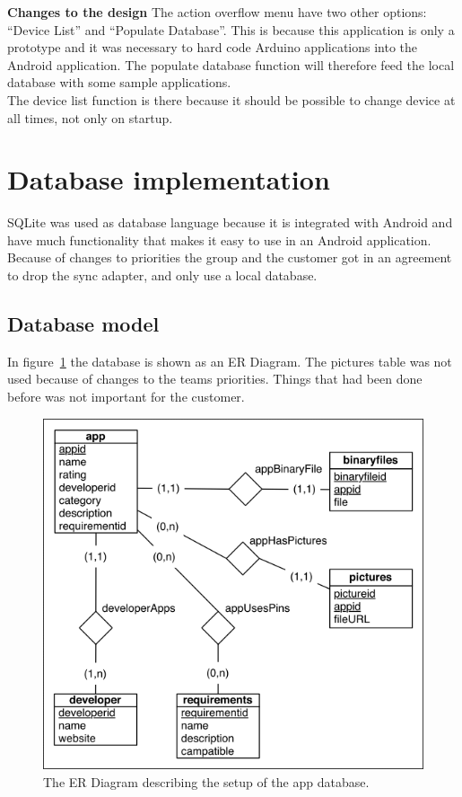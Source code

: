 	\textbf{Changes to the design}
	The action overflow menu have two other options: ``Device List'' and ``Populate Database''. This is because this application is only a prototype and it was necessary to hard code Arduino applications into the Android application. The populate database function will therefore feed the local database with some sample applications.\\

	The device list function is there because it should be possible to change device at all times, not only on startup.\\

\section{Database implementation}

	SQLite was used as database language because it is integrated with Android and have much functionality that makes it easy to use in an Android application. Because of changes to priorities the group and the customer got in an agreement to drop the sync adapter, and only use a local database.

	\subsection{Database model}

		In figure~\ref{fig:erdiagram} the database is shown as an ER Diagram. The pictures table was not used because of changes to the teams priorities. Things that had been done before was not important for the customer.

		\begin{figure}[H]
		\includegraphics[scale=1]{images/ER_Diagram.png}
		\caption{The ER Diagram describing the setup of the app database.}
		\label{fig:erdiagram}
		\end{figure}

